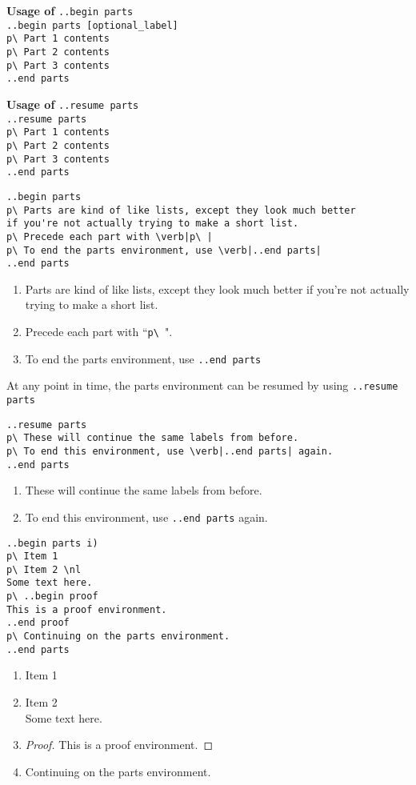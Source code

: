 \documentclass[12pt]{article}
\newcommand{\nl}{\\}
\newcounter{resumer}
\newenvironment{Parts}{
\setcounter{resumer}{0}
\begin{enumerate}[label=(\alph*)]
\newcommand\Part{\item}}{\setcounter{resumer}{\value{enumi}}\end{enumerate}}
\newenvironment{ResumeParts}{
\begin{enumerate}[label=(\alph*)]
\setcounter{enumi}{\value{resumer}}\newcommand\Part{\item}}{\setcounter{resumer}{\value{enumi}}\end{enumerate}}
\renewcommand\bold{\textbf}
\begin{document}
\begin{flushleft}

\bold{Usage of } \verb|..begin parts| \nl
\medskip
\verb|..begin parts [optional_label]| \nl
\verb|p\ Part 1 contents| \nl
\verb|p\ Part 2 contents| \nl
\verb|p\ Part 3 contents| \nl
\verb|..end parts| \nl

\bigskip

\bold{Usage of } \verb|..resume parts| \nl
\medskip
\verb|..resume parts| \nl
\verb|p\ Part 1 contents| \nl
\verb|p\ Part 2 contents| \nl
\verb|p\ Part 3 contents| \nl
\verb|..end parts| \nl

\bigskip

\verb|..begin parts| \nl
\verb|p\ Parts are kind of like lists, except they look much better| \nl
\verb|if you're not actually trying to make a short list. | \nl
\verb=p\ Precede each part with \verb|p\ |= \nl
\verb=p\ To end the parts environment, use \verb|..end parts|= \nl
\verb|..end parts|

\bigskip

\begin{Parts}
\Part Parts are kind of like lists, except they look much better if you're not actually trying to make a short list.
\Part Precede each part with ``\verb|p\ |".
\Part To end the parts environment, use \verb|..end parts|
\end{Parts}

\bigskip

At any point in time, the parts environment can be resumed by using \verb|..resume parts| \nl

\bigskip

\verb|..resume parts| \nl
\verb|p\ These will continue the same labels from before.| \nl
\verb=p\ To end this environment, use \verb|..end parts| again.= \nl
\verb|..end parts|

\begin{ResumeParts}
\Part These will continue the same labels from before.
\Part To end this environment, use \verb|..end parts| again.
\end{ResumeParts}

\bigskip

\verb|..begin parts i)| \nl
\verb|p\ Item 1| \nl
\verb|p\ Item 2 \nl| \nl
\verb|Some text here. | \nl
\verb|p\ ..begin proof| \nl
\verb|This is a proof environment. | \nl
\verb|..end proof| \nl
\verb|p\ Continuing on the parts environment. | \nl
\verb|..end parts| \nl

\bigskip

\renewenvironment{Parts}{
\setcounter{resumer}{0}
\begin{enumerate}[label=\roman*)]
\newcommand\Part{\item}}{\setcounter{resumer}{\value{enumi}}\end{enumerate}}
\begin{Parts}
\Part Item 1
\Part Item 2 \nl
Some text here.
\Part \begin{proof}
This is a proof environment.
\end{proof}
\Part Continuing on the parts environment.
\end{Parts}

\end{flushleft}
\end{document}
